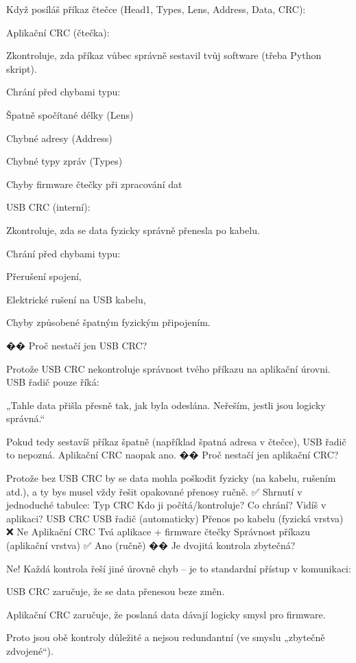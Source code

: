 Když posíláš příkaz čtečce (Head1, Types, Lens, Address, Data, CRC):

    Aplikační CRC (čtečka):

        Zkontroluje, zda příkaz vůbec správně sestavil tvůj software (třeba Python skript).

        Chrání před chybami typu:

            Špatně spočítané délky (Lens)

            Chybné adresy (Address)

            Chybné typy zpráv (Types)

            Chyby firmware čtečky při zpracování dat

    USB CRC (interní):

        Zkontroluje, zda se data fyzicky správně přenesla po kabelu.

        Chrání před chybami typu:

            Přerušení spojení,

            Elektrické rušení na USB kabelu,

            Chyby způsobené špatným fyzickým připojením.

�� Proč nestačí jen USB CRC?

Protože USB CRC nekontroluje správnost tvého příkazu na aplikační úrovni.
USB řadič pouze říká:

    „Tahle data přišla přesně tak, jak byla odeslána. Neřeším, jestli jsou logicky správná.“

Pokud tedy sestavíš příkaz špatně (například špatná adresa v čtečce), USB řadič to nepozná. Aplikační CRC naopak ano.
�� Proč nestačí jen aplikační CRC?

Protože bez USB CRC by se data mohla poškodit fyzicky (na kabelu, rušením atd.), a ty bys musel vždy řešit opakované přenosy ručně.
✅ Shrnutí v jednoduché tabulce:
Typ CRC	Kdo ji počítá/kontroluje?	Co chrání?	Vidíš v aplikaci?
USB CRC	USB řadič (automaticky)	Přenos po kabelu (fyzická vrstva)	❌ Ne
Aplikační CRC	Tvá aplikace + firmware čtečky	Správnost příkazu (aplikační vrstva)	✅ Ano (ručně)
�� Je dvojitá kontrola zbytečná?

Ne! Každá kontrola řeší jiné úrovně chyb – je to standardní přístup v komunikaci:

    USB CRC zaručuje, že se data přenesou beze změn.

    Aplikační CRC zaručuje, že poslaná data dávají logicky smysl pro firmware.

Proto jsou obě kontroly důležité a nejsou redundantní (ve smyslu „zbytečně zdvojené“).

